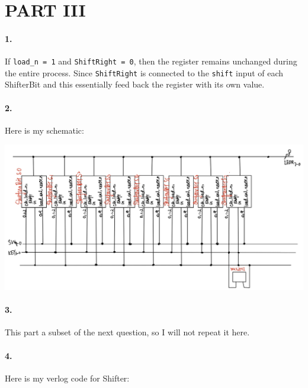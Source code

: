 \documentclass[oneside, 10pt]{article}
\begin{document}
\section*{PART III}
\paragraph{1.} If \texttt{load\_n = 1} and \texttt{ShiftRight = 0}, then the 
register remains unchanged during the entire process. Since \texttt{ShiftRight}
is connected to the \texttt{shift} input of each ShifterBit and this essentially 
feed back the register with its own value. 
\paragraph{2.} Here is my schematic:
\begin{center}
    \includegraphics[scale=0.2]{q3_scheme.jpg}
\end{center}
\paragraph{3.} This part a subset of the next question, so I will not repeat it here.
\paragraph{4.} Here is my verlog code for Shifter:
\end{document}
